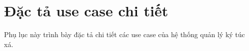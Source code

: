 \documentclass[../DoAn.tex]{subfiles}
\begin{document}
\section{Đặc tả use case chi tiết}

Phụ lục này trình bày đặc tả chi tiết các use case của hệ thống quản lý ký túc xá.

\end{document}
